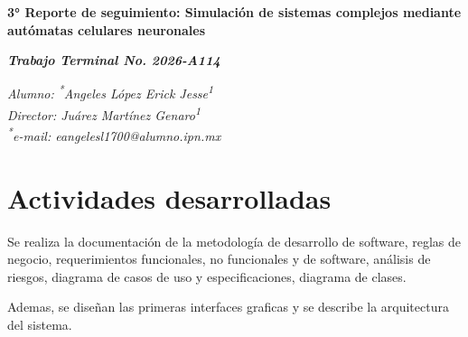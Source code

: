 \documentclass[letterpaper,10pt,oneside]{article}
\newcommand\authormark[1]{\textsuperscript{#1}}
\begin{document}
	
	\begin{center}
		\fontsize{14}{16}\selectfont\bfseries
		3° Reporte de seguimiento: 
		Simulación de sistemas complejos mediante autómatas celulares neuronales
	\end{center}
	
	\begin{center}
		\fontsize{14}{16}\selectfont\bfseries
		\textit{Trabajo Terminal No. 2026-A114}
	\end{center}
	
	\begin{center}
		\fontsize{12}{16}\selectfont
		\textit{Alumno: \authormark{*}Angeles López Erick Jesse\authormark{1}} \\
		\textit{Director: Juárez Martínez Genaro\authormark{1}} \\
		\textit{\authormark{*}e-mail: eangelesl1700@alumno.ipn.mx}
	\end{center}

	\section{Actividades desarrolladas}
	
	Se realiza la documentación de la metodología de desarrollo de software, reglas de negocio, requerimientos funcionales, no funcionales y de software, análisis de riesgos, diagrama de casos de uso y especificaciones, diagrama de clases. 
	
	Ademas, se diseñan las primeras interfaces graficas y se describe la arquitectura del sistema.
	
\end{document}
